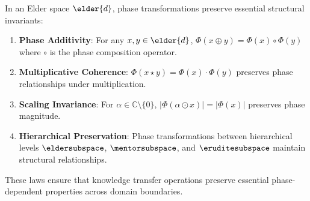 \begin{theorem}
\label{thm:phase_conservation_laws}
In an Elder space $\elder{d}$, phase transformations preserve essential structural invariants:
\begin{enumerate}
    \item \textbf{Phase Additivity}: For any $x, y \in \elder{d}$, $\Phi(x \oplus y) = \Phi(x) \circ \Phi(y)$ where $\circ$ is the phase composition operator.
    
    \item \textbf{Multiplicative Coherence}: $\Phi(x \star y) = \Phi(x) \cdot \Phi(y)$ preserves phase relationships under multiplication.
    
    \item \textbf{Scaling Invariance}: For $\alpha \in \mathbb{C} \setminus \{0\}$, $|\Phi(\alpha \odot x)| = |\Phi(x)|$ preserves phase magnitude.
    
    \item \textbf{Hierarchical Preservation}: Phase transformations between hierarchical levels $\eldersubspace$, $\mentorsubspace$, and $\eruditesubspace$ maintain structural relationships.
\end{enumerate}
These laws ensure that knowledge transfer operations preserve essential phase-dependent properties across domain boundaries.
\end{theorem}

